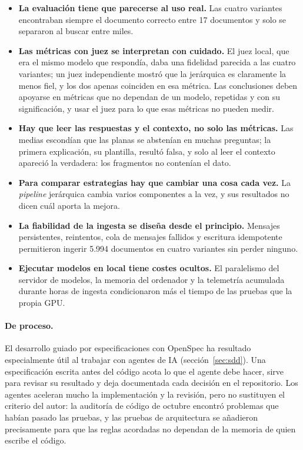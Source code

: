 \begin{itemize}
  \item \textbf{La evaluación tiene que parecerse al uso real.} Las cuatro variantes encontraban siempre el documento correcto entre 17 documentos y solo se separaron al buscar entre miles.
  \item \textbf{Las métricas con juez se interpretan con cuidado.} El juez local, que era el mismo modelo que respondía, daba una fidelidad parecida a las cuatro variantes; un juez independiente mostró que la jerárquica es claramente la menos fiel, y los dos apenas coinciden en esa métrica. Las conclusiones deben apoyarse en métricas que no dependan de un modelo, repetidas y con su significación, y usar el juez para lo que esas métricas no pueden medir.
  \item \textbf{Hay que leer las respuestas y el contexto, no solo las métricas.} Las medias escondían que las planas se abstenían en muchas preguntas; la primera explicación, su plantilla, resultó falsa, y solo al leer el contexto apareció la verdadera: los fragmentos no contenían el dato.
  \item \textbf{Para comparar estrategias hay que cambiar una cosa cada vez.} La \emph{pipeline} jerárquica cambia varios componentes a la vez, y sus resultados no dicen cuál aporta la mejora.
  \item \textbf{La fiabilidad de la ingesta se diseña desde el principio.} Mensajes persistentes, reintentos, cola de mensajes fallidos y escritura idempotente permitieron ingerir 5.994 documentos en cuatro variantes sin perder ninguno.
  \item \textbf{Ejecutar modelos en local tiene costes ocultos.} El paralelismo del servidor de modelos, la memoria del ordenador y la telemetría acumulada durante horas de ingesta condicionaron más el tiempo de las pruebas que la propia GPU.
\end{itemize}

\paragraph{De proceso.} El desarrollo guiado por especificaciones con OpenSpec ha resultado especialmente útil al trabajar con agentes de IA (sección~\ref{sec:sdd}). Una especificación escrita antes del código acota lo que el agente debe hacer, sirve para revisar su resultado y deja documentada cada decisión en el repositorio. Los agentes aceleran mucho la implementación y la revisión, pero no sustituyen el criterio del autor: la auditoría de código de octubre encontró problemas que habían pasado las pruebas, y las pruebas de arquitectura se añadieron precisamente para que las reglas acordadas no dependan de la memoria de quien escribe el código.

